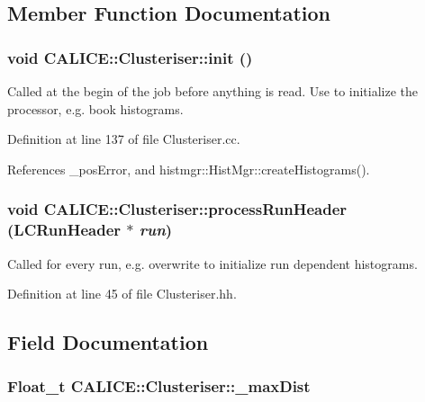 \subsection{Member Function Documentation}
\subsubsection[{init}]{\setlength{\rightskip}{0pt plus 5cm}void CALICE::Clusteriser::init ()}\label{classCALICE_1_1Clusteriser_ac1461d10ca6ff3ffe4e90e248382d28d}


Called at the begin of the job before anything is read. Use to initialize the processor, e.g. book histograms. 

Definition at line 137 of file Clusteriser.cc.

References \_\-posError, and histmgr::HistMgr::createHistograms().
\subsubsection[{processRunHeader}]{\setlength{\rightskip}{0pt plus 5cm}void CALICE::Clusteriser::processRunHeader (LCRunHeader $\ast$ {\em run})\hspace{0.3cm}{\ttfamily  [inline]}}\label{classCALICE_1_1Clusteriser_a243b8bcabecb882cbee9787a5b34f2c1}


Called for every run, e.g. overwrite to initialize run dependent histograms. 

Definition at line 45 of file Clusteriser.hh.

\subsection{Field Documentation}
\subsubsection[{\_\-maxDist}]{\setlength{\rightskip}{0pt plus 5cm}Float\_\-t {\bf CALICE::Clusteriser::\_\-maxDist}\hspace{0.3cm}{\ttfamily  [protected]}}\label{classCALICE_1_1Clusteriser_a807005cec4f96c8a6b5aaac0def5e81b}


